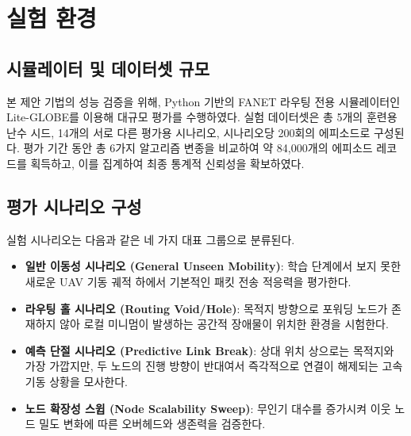 \section{실험 환경}
\label{sec:실험환경}

\subsection{시뮬레이터 및 데이터셋 규모}
본 제안 기법의 성능 검증을 위해, Python 기반의 FANET 라우팅 전용 시뮬레이터인 Lite-GLOBE를 이용해 대규모 평가를 수행하였다. 실험 데이터셋은 총 5개의 훈련용 난수 시드, 14개의 서로 다른 평가용 시나리오, 시나리오당 200회의 에피소드로 구성된다. 평가 기간 동안 총 6가지 알고리즘 변종을 비교하여 약 84,000개의 에피소드 레코드를 획득하고, 이를 집계하여 최종 통계적 신뢰성을 확보하였다.

\subsection{평가 시나리오 구성}
실험 시나리오는 다음과 같은 네 가지 대표 그룹으로 분류된다.
\begin{itemize}
    \item \textbf{일반 이동성 시나리오 (General Unseen Mobility)}: 학습 단계에서 보지 못한 새로운 UAV 기동 궤적 하에서 기본적인 패킷 전송 적응력을 평가한다.
    \item \textbf{라우팅 홀 시나리오 (Routing Void/Hole)}: 목적지 방향으로 포워딩 노드가 존재하지 않아 로컬 미니멈이 발생하는 공간적 장애물이 위치한 환경을 시험한다.
    \item \textbf{예측 단절 시나리오 (Predictive Link Break)}: 상대 위치 상으로는 목적지와 가장 가깝지만, 두 노드의 진행 방향이 반대여서 즉각적으로 연결이 해제되는 고속 기동 상황을 모사한다.
    \item \textbf{노드 확장성 스윕 (Node Scalability Sweep)}: 무인기 대수를 증가시켜 이웃 노드 밀도 변화에 따른 오버헤드와 생존력을 검증한다.
\end{itemize}

